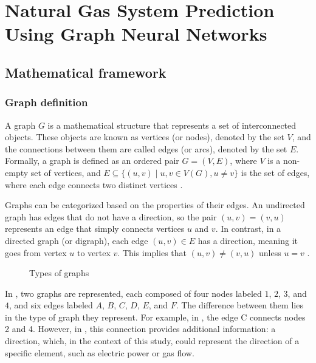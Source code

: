 \chapter{Natural Gas System Prediction Using Graph Neural Networks} \label{cap:lienal-censnet}

\section{Mathematical framework}

\subsection{Graph definition}


A graph $G$ is a mathematical structure that represents a set of interconnected objects. These objects are known as vertices (or nodes), denoted by the set $V$, and the connections between them are called edges (or arcs), denoted by the set $E$. Formally, a graph is defined as an ordered pair $G = (V, E)$, where $V$ is a non-empty set of vertices, and $E \subseteq \{(u, v) \mid u, v \in V(G), u \neq v\}$ is the set of edges, where each edge connects two distinct vertices \cite{Trudeau_2015}.

Graphs can be categorized based on the properties of their edges. An undirected graph has edges that do not have a direction, so the pair $(u, v) = (v, u)$ represents an edge that simply connects vertices $u$ and $v$. In contrast, in a directed graph (or digraph), each edge $(u, v) \in E$ has a direction, meaning it goes from vertex $u$ to vertex $v$. This implies that $(u, v) \neq (v, u)$ unless $u = v$ \cite{Bender_Williamson_2010}.

\begin{figure}
    \centering
        \setlength{}        
        \setlength{} 
    \caption{Types of graphs}\label{fig:graph_definition}
\end{figure}

In , two graphs are represented, each composed of four nodes labeled $1$, $2$, $3$, and $4$, and six edges labeled $A$, $B$, $C$, $D$, $E$, and $F$. The difference between them lies in the type of graph they represent. For example, in , the edge C connects nodes 2 and 4. However, in , this connection provides additional information: a direction, which, in the context of this study, could represent the direction of a specific element, such as electric power or gas flow.


